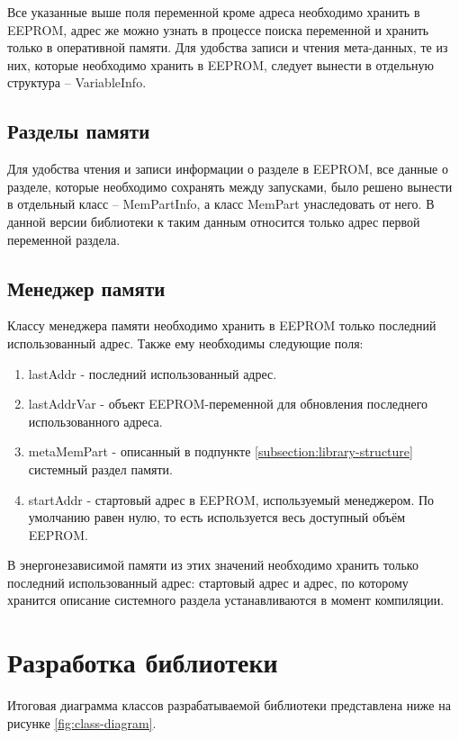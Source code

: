 Все указанные выше поля переменной кроме адреса необходимо хранить в EEPROM, адрес же можно узнать в процессе поиска переменной и хранить только в оперативной памяти.
Для удобства записи и чтения мета-данных, те из них, которые необходимо хранить в EEPROM, следует вынести в отдельную структура -- VariableInfo.

\subsection{Разделы памяти}

Для удобства чтения и записи информации о разделе в EEPROM, все данные о разделе, которые необходимо сохранять между запусками, было решено вынести в отдельный класс -- MemPartInfo, а класс MemPart унаследовать от него.
В данной версии библиотеки к таким данным относится только адрес первой переменной раздела.

\subsection{Менеджер памяти}

Классу менеджера памяти необходимо хранить в EEPROM только последний использованный адрес.
Также ему необходимы следующие поля:
\begin{enumerate}
	\item lastAddr - последний использованный адрес.
	\item lastAddrVar - объект EEPROM-переменной для обновления последнего использованного адреса.
	\item metaMemPart - описанный в подпункте \ref{subsection:library-structure} системный раздел памяти.
	\item startAddr - стартовый адрес в EEPROM, используемый менеджером. По умолчанию равен нулю, то есть используется весь доступный объём EEPROM.
\end{enumerate}

В энергонезависимой памяти из этих значений необходимо хранить только последний использованный адрес: стартовый адрес и адрес, по которому хранится описание системного раздела устанавливаются в момент компиляции.

\section{Разработка библиотеки}

Итоговая диаграмма классов разрабатываемой библиотеки представлена ниже на рисунке \ref{fig:class-diagram}.


